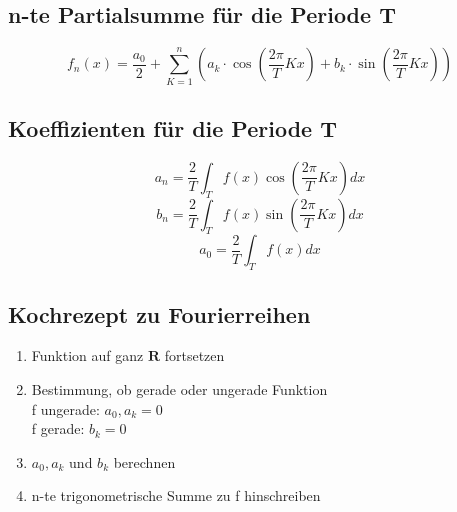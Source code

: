 \subsection{n-te Partialsumme für die Periode T}
\[ \boxed{f_n(x) = \frac{a_0}{2} + \sum_{K=1}^n \left(a_k \cdot \cos \left(\frac{2 \pi}{T} K x\right) + b_k \cdot \sin\left(\frac{2 \pi}{T} K x\right)\right)} \]

\subsection{Koeffizienten für die Periode T}
\[ \boxed{a_n = \frac{2}{T} \int_T f(x) \cos(\frac{2 \pi}{T} K x) dx} \]
\[ \boxed{b_n = \frac{2}{T} \int_T f(x) \sin(\frac{2 \pi}{T} K x) dx} \]
\[ \boxed{a_0 = \frac{2}{T} \int_T f(x) dx
} \]

\subsection{Kochrezept zu Fourierreihen}
\begin{enumerate}
  \item Funktion auf ganz $\mathbf{R}$ fortsetzen
  \item Bestimmung, ob gerade oder ungerade Funktion\\
  f ungerade: $a_0, a_k = 0$\\
  f gerade: $b_k = 0$
  \item $a_0, a_k$ und $b_k$ berechnen
  \item n-te trigonometrische Summe zu f hinschreiben
\end{enumerate}


